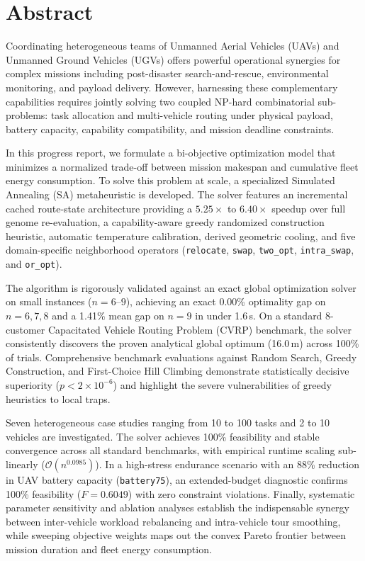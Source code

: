 \chapter*{Abstract}
\label{chap:abstract}
\pagestyle{plain}
Coordinating heterogeneous teams of Unmanned Aerial Vehicles (UAVs) and Unmanned Ground Vehicles (UGVs) offers powerful operational synergies for complex missions including post-disaster search-and-rescue, environmental monitoring, and payload delivery. However, harnessing these complementary capabilities requires jointly solving two coupled NP-hard combinatorial sub-problems: task allocation and multi-vehicle routing under physical payload, battery capacity, capability compatibility, and mission deadline constraints. 

In this progress report, we formulate a bi-objective optimization model that minimizes a normalized trade-off between mission makespan and cumulative fleet energy consumption. To solve this problem at scale, a specialized Simulated Annealing (SA) metaheuristic is developed. The solver features an incremental cached route-state architecture providing a $5.25\times$ to $6.40\times$ speedup over full genome re-evaluation, a capability-aware greedy randomized construction heuristic, automatic temperature calibration, derived geometric cooling, and five domain-specific neighborhood operators (\texttt{relocate}, \texttt{swap}, \texttt{two\_opt}, \texttt{intra\_swap}, and \texttt{or\_opt}).

The algorithm is rigorously validated against an exact global optimization solver on small instances ($n=6\text{--}9$), achieving an exact 0.00\% optimality gap on $n=6,7,8$ and a 1.41\% mean gap on $n=9$ in under 1.6\,s. On a standard 8-customer Capacitated Vehicle Routing Problem (CVRP) benchmark, the solver consistently discovers the proven analytical global optimum (16.0\,m) across 100\% of trials. Comprehensive benchmark evaluations against Random Search, Greedy Construction, and First-Choice Hill Climbing demonstrate statistically decisive superiority ($p < 2 \times 10^{-6}$) and highlight the severe vulnerabilities of greedy heuristics to local traps.

Seven heterogeneous case studies ranging from 10 to 100 tasks and 2 to 10 vehicles are investigated. The solver achieves 100\% feasibility and stable convergence across all standard benchmarks, with empirical runtime scaling sub-linearly ($\mathcal{O}(n^{0.0985})$). In a high-stress endurance scenario with an 88\% reduction in UAV battery capacity (\texttt{battery75}), an extended-budget diagnostic confirms 100\% feasibility ($F=0.6049$) with zero constraint violations. Finally, systematic parameter sensitivity and ablation analyses establish the indispensable synergy between inter-vehicle workload rebalancing and intra-vehicle tour smoothing, while sweeping objective weights maps out the convex Pareto frontier between mission duration and fleet energy consumption.